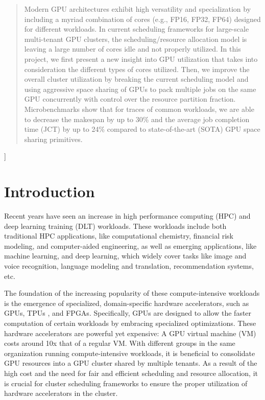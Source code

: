 \documentclass{article}
\begin{document}
\begin{abstract}
Modern GPU architectures exhibit high versatility and specialization by including a myriad combination of cores (e.g., FP16, FP32, FP64) designed for different workloads. In current scheduling frameworks for large-scale multi-tenant GPU clusters, the scheduling/resource allocation model is leaving a large number of cores idle and not properly utilized. In this project, we first present a new insight into GPU utilization that takes into consideration the different types of cores utilized. Then, we improve the overall cluster utilization by breaking the current scheduling model and using aggressive space sharing of GPUs to pack multiple jobs on the same GPU concurrently with control over the resource partition fraction. Microbenchmarks show that for traces of common workloads, we are able to decrease the makespan by up to 30\% and the average job completion time (JCT) by up to 24\% compared to state-of-the-art (SOTA) GPU space sharing primitives.
\end{abstract}
]

\printAffiliationsAndNotice{} %

\section{Introduction}
\label{submission}

Recent years have seen an increase in high performance computing (HPC) and deep learning training (DLT) workloads. These workloads include both traditional HPC applications, like computational chemistry, financial risk modeling, and computer-aided engineering, as well as emerging applications, like machine learning, and deep learning, which widely cover tasks like image and voice recognition, language modeling and translation, recommendation systems, etc.

The foundation of the increasing popularity of these compute-intensive workloads is the emergence of specialized, domain-specific hardware accelerators, such as GPUs, TPUs \cite{tpu}, and FPGAs. Specifically, GPUs are designed to allow the faster computation of certain workloads by embracing specialized optimizations. These hardware accelerators are powerful yet expensive: A GPU virtual machine (VM) costs around 10x that of a regular VM. With different groups in the same organization running compute-intensive workloads, it is beneficial to consolidate GPU resources into a GPU cluster shared by multiple tenants. As a result of the high cost and the need for fair and efficient scheduling and resource allocation, it is crucial for cluster scheduling frameworks to ensure the proper utilization of hardware accelerators in the cluster.
\end{document}

